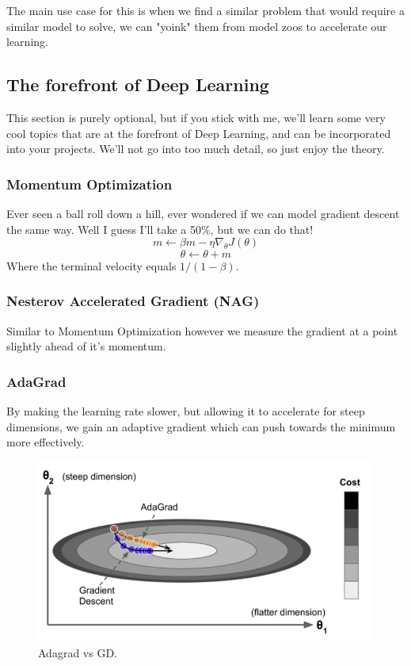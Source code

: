 \documentclass[article]{llncs}
\begin{document}
The main use case for this is when we find a similar problem that would require a similar model to solve, we can "yoink" them from model zoos to accelerate our learning.

\subsection{The forefront of Deep Learning}

This section is purely optional, but if you stick with me, we'll learn some very cool topics that are at the forefront of Deep Learning, and can be incorporated into your projects. We'll not go into too much detail, so just enjoy the theory.

\subsubsection{Momentum Optimization}
Ever seen a ball roll down a hill, ever wondered if we can model gradient descent the same way. Well I guess I'll take a 50\%, but we can do that! 
$$
m \xleftarrow{} \beta m - \eta \nabla_\theta J(\theta)
$$
$$
\theta \xleftarrow{} \theta + m
$$
Where the terminal velocity equals $1/(1-\beta)$.

\subsubsection{Nesterov Accelerated Gradient (NAG)}
Similar to Momentum Optimization however we measure the gradient at a point slightly ahead of it's momentum.

\subsubsection{AdaGrad}
By making the learning rate slower, but allowing it to accelerate for steep dimensions, we gain an adaptive gradient which can push towards the minimum more effectively.

\begin{figure}[H]
\centering
\includegraphics[scale=0.5]{fig8.PNG}
\caption{Adagrad vs GD.} \label{fig8}
\end{figure}
\end{document}
